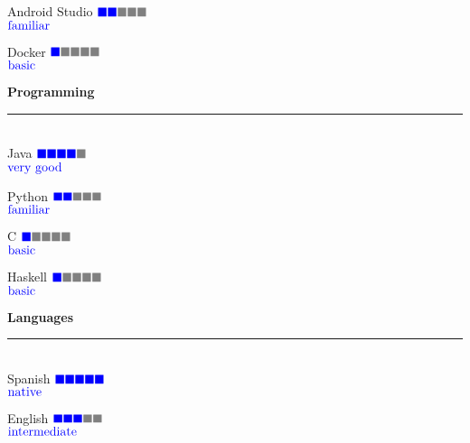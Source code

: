 \documentclass{article}
\begin{document}
\begin{minipage}{0.3\linewidth}
  \large Android Studio \hfill $\color{blue} \blacksquare\color{blue} \blacksquare \color{gray} \blacksquare \color{gray} \blacksquare  \color{gray} \blacksquare$  \\[-0.8mm]
  \null\hfill \small{ $\color{blue} \textnormal{familiar}$}

  \large Docker \hfill $\color{blue} \blacksquare\color{gray} \blacksquare \color{gray} \blacksquare \color{gray} \blacksquare  \color{gray} \blacksquare$  \\[-0.8mm]
  \null\hfill \small{ $\color{blue} \textnormal{basic}$}

  \vspace{0.3cm}
  \textbf{\Large{\color{BlueViolet}Programming}}\\[-0.25cm]
  {\color{BlueViolet} \rule{\linewidth}{0.1mm} }\\
  \large Java \hfill $\color{blue} \blacksquare\color{blue} \blacksquare \color{blue} \blacksquare \color{blue} \blacksquare  \color{gray} \blacksquare$  \\[-0.8mm]
  \null\hfill \small{ $\color{blue} \textnormal{very good}$}

  \large Python \hfill $\color{blue} \blacksquare\color{blue} \blacksquare \color{gray} \blacksquare \color{gray} \blacksquare  \color{gray} \blacksquare$  \\[-0.8mm]
  \null\hfill \small{ $\color{blue} \textnormal{familiar}$}

  \large C \hfill $\color{blue} \blacksquare \color{gray} \blacksquare \color{gray} \blacksquare \color{gray} \blacksquare  \color{gray} \blacksquare$  \\[-0.8mm]
  \null\hfill \small{ $\color{blue} \textnormal{basic}$}

  \large Haskell \hfill $\color{blue} \blacksquare \color{gray} \blacksquare \color{gray} \blacksquare \color{gray} \blacksquare  \color{gray} \blacksquare$  \\[-0.8mm]
  \null\hfill \small{ $\color{blue} \textnormal{basic}$}

  \textbf{\Large{\color{BlueViolet}Languages}}\\[-0.25cm]
  {\color{BlueViolet} \rule{\linewidth}{0.1mm} }\\
  \large Spanish \hfill $\color{blue} \blacksquare\color{blue} \blacksquare \color{blue} \blacksquare \color{blue} \blacksquare  \color{blue} \blacksquare$  \\[-0.8mm]
  \null\hfill \small{ $\color{blue} \textnormal{native}$}

  \large English \hfill $\color{blue} \blacksquare\color{blue} \blacksquare \color{blue} \blacksquare \color{gray} \blacksquare  \color{gray} \blacksquare$  \\[-0.8mm]
  \null\hfill \small{ $\color{blue} \textnormal{intermediate}$}
  
\end{minipage}
\end{document}
